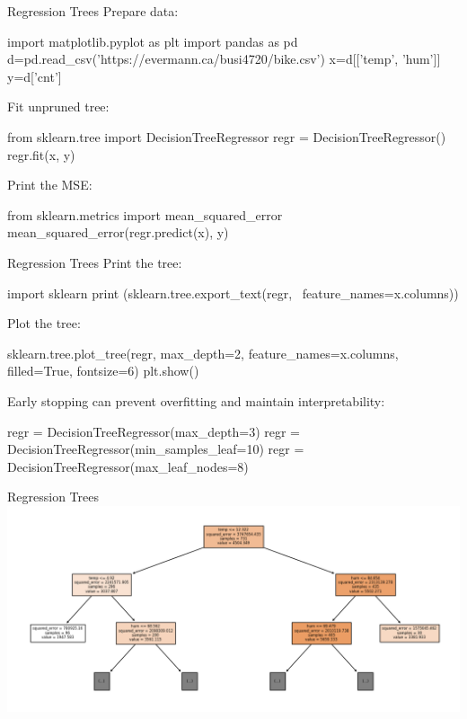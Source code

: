 \documentclass[ignorenonframetext,xcolor=x11names]{beamer}
\begin{document}
\begin{frame}[fragile]{Regression Trees}
Prepare data:
\begin{pythoncode}
import matplotlib.pyplot as plt
import pandas as pd
d=pd.read_csv('https://evermann.ca/busi4720/bike.csv')
x=d[['temp', 'hum']]
y=d['cnt']
\end{pythoncode}
Fit unpruned tree:
\begin{pythoncode}
from sklearn.tree import DecisionTreeRegressor
regr = DecisionTreeRegressor()
regr.fit(x, y)
\end{pythoncode}
Print the MSE:
\begin{pythoncode}
from sklearn.metrics import mean_squared_error
mean_squared_error(regr.predict(x), y)
\end{pythoncode}
\end{frame}

\begin{frame}[fragile]{Regression Trees}
Print the tree:
\begin{pythoncode}
import sklearn
print (sklearn.tree.export_text(regr, \
    feature_names=x.columns))
\end{pythoncode}
Plot the tree:
\begin{pythoncode}
sklearn.tree.plot_tree(regr, 
    max_depth=2, feature_names=x.columns,
    filled=True, fontsize=6)
plt.show()
\end{pythoncode}
Early stopping can prevent overfitting and maintain interpretability:
\begin{pythoncode}
regr = DecisionTreeRegressor(max_depth=3)
regr = DecisionTreeRegressor(min_samples_leaf=10)
regr = DecisionTreeRegressor(max_leaf_nodes=8)
\end{pythoncode}
\end{frame}

\begin{frame}{Regression Trees}
\centering
\includegraphics[width=\textwidth]{reg_tree.png}
\end{frame}
\end{document}
